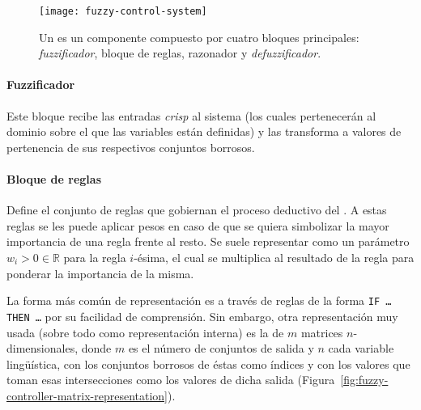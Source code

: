 \begin{figure}
	\centering
	\texttt{[image: fuzzy-control-system]}
	\caption[Esquema de un ]{Un  es un componente compuesto por cuatro bloques principales: \textit{fuzzificador}, bloque de reglas, razonador y \textit{defuzzificador}.}
	\label{fig:fuzzy-control-system}
\end{figure}

\paragraph{Fuzzificador}

Este bloque recibe las entradas \textit{crisp} al sistema (los cuales pertenecerán al dominio sobre el que las variables están definidas) y las transforma a valores de pertenencia de sus respectivos conjuntos borrosos.

\paragraph{Bloque de reglas}

Define el conjunto de reglas que gobiernan el proceso deductivo del . A estas reglas se les puede aplicar pesos en caso de que se quiera simbolizar la mayor importancia de una regla frente al resto. Se suele representar como un parámetro $w_i > 0 \in \mathbb{R}$ para la regla $i$-ésima, el cual se multiplica al resultado de la regla para ponderar la importancia de la misma.

La forma más común de representación es a través de reglas de la forma \texttt{IF \ldots THEN \ldots} por su facilidad de comprensión. Sin embargo, otra representación muy usada (sobre todo como representación interna) es la de $m$ matrices $n$-dimensionales, donde $m$ es el número de conjuntos de salida y $n$ cada variable lingüística, con los conjuntos borrosos de éstas como índices y con los valores que toman esas intersecciones como los valores de dicha salida (Figura~\ref{fig:fuzzy-controller-matrix-representation}).

